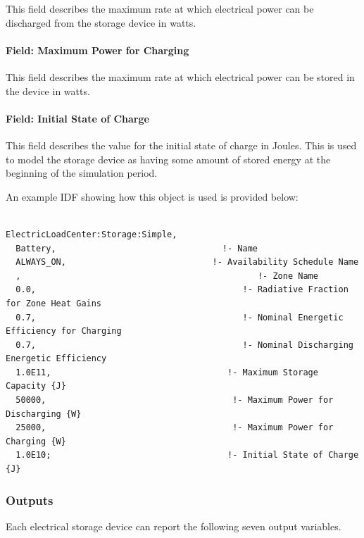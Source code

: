 This field describes the maximum rate at which electrical power can be discharged from the storage device in watts.

\paragraph{Field: Maximum Power for Charging}\label{field-maximum-power-for-charging}

This field describes the maximum rate at which electrical power can be stored in the device in watts.

\paragraph{Field: Initial State of Charge}\label{field-initial-state-of-charge}

This field describes the value for the initial state of charge in Joules. This is used to model the storage device as having some amount of stored energy at the beginning of the simulation period.

An example IDF showing how this object is used is provided below:

\begin{lstlisting}

ElectricLoadCenter:Storage:Simple,
  Battery,                                 !- Name
  ALWAYS_ON,                             !- Availability Schedule Name
  ,                                               !- Zone Name
  0.0,                                         !- Radiative Fraction for Zone Heat Gains
  0.7,                                         !- Nominal Energetic Efficiency for Charging
  0.7,                                         !- Nominal Discharging Energetic Efficiency
  1.0E11,                                   !- Maximum Storage Capacity {J}
  50000,                                     !- Maximum Power for Discharging {W}
  25000,                                     !- Maximum Power for Charging {W}
  1.0E10;                                   !- Initial State of Charge {J}
\end{lstlisting}

\subsubsection{Outputs}\label{outputs-4-003}

Each electrical storage device can report the following seven output variables.

